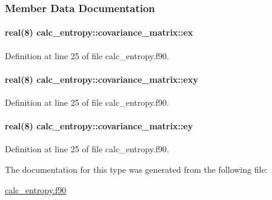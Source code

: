 \subsubsection{Member Data Documentation}
\hypertarget{structcalc__entropy_1_1covariance__matrix_addc65f80d12b7a1c1852aa2d7e44180b}{
\paragraph[{ex}]{\setlength{\rightskip}{0pt plus 5cm}real(8) calc\-\_\-entropy\-::covariance\-\_\-matrix\-::ex}}\label{structcalc__entropy_1_1covariance__matrix_addc65f80d12b7a1c1852aa2d7e44180b}


Definition at line 25 of file calc\-\_\-entropy.\-f90.

\hypertarget{structcalc__entropy_1_1covariance__matrix_af2db7d5370919cb7c9fa56cd45ff78cb}{
\paragraph[{exy}]{\setlength{\rightskip}{0pt plus 5cm}real(8) calc\-\_\-entropy\-::covariance\-\_\-matrix\-::exy}}\label{structcalc__entropy_1_1covariance__matrix_af2db7d5370919cb7c9fa56cd45ff78cb}


Definition at line 25 of file calc\-\_\-entropy.\-f90.

\hypertarget{structcalc__entropy_1_1covariance__matrix_aa9a708e809193ff3d9bb3bc8e8827f58}{
\paragraph[{ey}]{\setlength{\rightskip}{0pt plus 5cm}real(8) calc\-\_\-entropy\-::covariance\-\_\-matrix\-::ey}}\label{structcalc__entropy_1_1covariance__matrix_aa9a708e809193ff3d9bb3bc8e8827f58}


Definition at line 25 of file calc\-\_\-entropy.\-f90.



The documentation for this type was generated from the following file\-:\begin{DoxyCompactItemize}
\item 
\hyperlink{calc__entropy_8f90}{calc\-\_\-entropy.\-f90}\end{DoxyCompactItemize}
